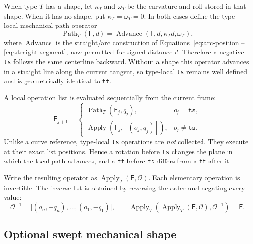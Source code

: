 \documentclass[11pt,a4paper]{article}
\newcommand{\Frame}{\mathsf{F}}
\newcommand{\Apply}{\operatorname{Apply}}
\newcommand{\Path}{\operatorname{Path}}
\newcommand{\ops}{\mathcal{O}}
\begin{document}
When type $T$ has a shape, let $\kappa_T$ and $\omega_T$ be the curvature and
roll stored in that shape.  When it has no shape, put
$\kappa_T=\omega_T=0$.  In both cases define the type-local mechanical path
operator
\begin{equation}
  \Path_T(\Frame,d)
  =\operatorname{Advance}(\Frame,d,\kappa_T d,\omega_T),
  \label{eq:type-path}
\end{equation}
where \(\operatorname{Advance}\) is the straight/arc construction of
Equations~\eqref{eq:arc-position}--\eqref{eq:straight-segment}, now permitted
for signed distance $d$.  Therefore a negative \texttt{ts} follows the same
centerline backward.  Without a shape this operator advances in a straight
line along the current tangent, so type-local \texttt{ts} remains well defined
and is geometrically identical to \texttt{tt}.

A local operation list is evaluated sequentially from the current frame:
\begin{equation}
 \Frame_{j+1}=
 \begin{cases}
   \Path_T(\Frame_j,q_j), & o_j=\texttt{ts},\\
   \Apply(\Frame_j,[(o_j,q_j)]), & o_j\ne\texttt{ts}.
 \end{cases}
 \label{eq:type-operation-recursion}
\end{equation}
Unlike a curve reference, type-local \texttt{ts} operations are \emph{not}
collected.  They execute at their exact list positions.  Hence a rotation
before \texttt{ts} changes the plane in which the local path advances, and a
\texttt{tt} before \texttt{ts} differs from a \texttt{tt} after it.

Write the resulting operator as $\Apply_T(\Frame,\ops)$.  Each elementary
operation is invertible.  The inverse list is obtained by reversing the order
and negating every value:
\begin{equation}
  \ops^{-1}=\big[(o_n,-q_n),\ldots,(o_1,-q_1)\big],
  \qquad
  \Apply_T(\Apply_T(\Frame,\ops),\ops^{-1})=\Frame.
  \label{eq:inverse-operations}
\end{equation}

\subsection{Optional swept mechanical shape}
\end{document}
